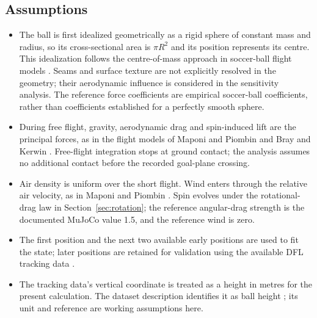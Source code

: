 \documentclass[12pt,letterpaper]{article}
\begin{document}
\subsection{Assumptions}
\begin{itemize}
\item The ball is first idealized geometrically as a rigid sphere of constant mass and radius, so its cross-sectional area is $\pi R^2$ and its position represents its centre. This idealization follows the centre-of-mass approach in soccer-ball flight models \cite{maponi,bray,myers}. Seams and surface texture are not explicitly resolved in the geometry; their aerodynamic influence is considered in the sensitivity analysis. The reference force coefficients are empirical soccer-ball coefficients, rather than coefficients established for a perfectly smooth sphere.
\item During free flight, gravity, aerodynamic drag and spin-induced lift are the principal forces, as in the flight models of Maponi and Piombin and Bray and Kerwin \cite{maponi,bray}. Free-flight integration stops at ground contact; the analysis assumes no additional contact before the recorded goal-plane crossing.
\item Air density is uniform over the short flight. Wind enters through the relative air velocity, as in Maponi and Piombin \cite{maponi}. Spin evolves under the rotational-drag law in Section~\ref{sec:rotation}; the reference angular-drag strength is the documented MuJoCo value 1.5, and the reference wind is zero.
\item The first position and the next two available early positions are used to fit the state; later positions are retained for validation using the available DFL tracking data \cite{bassek}.
\item The tracking data's vertical coordinate is treated as a height in metres for the present calculation. The dataset description identifies it as ball height \cite{bassek}; its unit and reference are working assumptions here.
\end{itemize}
\end{document}
